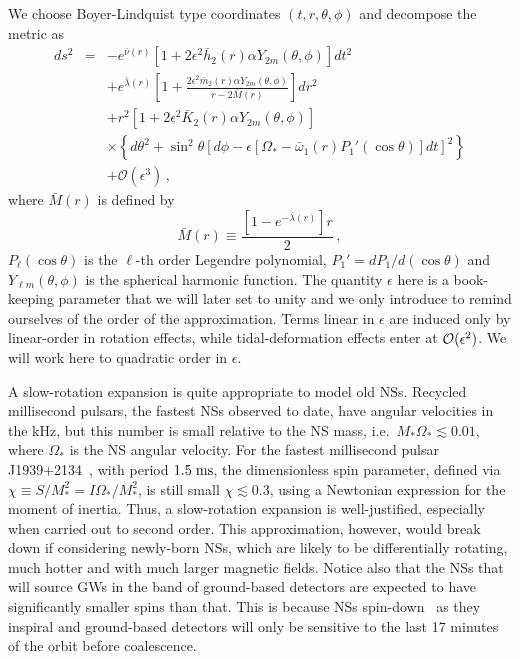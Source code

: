 \documentclass[aps,twocolumn,nofootinbib,showpacs,superscriptaddress,hyperref]{revtex4-1}
\newcommand\be{\begin{equation}}
\newcommand\ba{\begin{eqnarray}}
\newcommand\ee{\end{equation}}
\newcommand\ea{\end{eqnarray}}
\newcommand{\nn}{\nonumber}
\newcommand{\NS}{*}
\begin{document}
We choose Boyer-Lindquist type coordinates $(t,r,\theta,\phi)$ and decompose the metric as
%
\ba
ds^2 &=& -e^{\bar{\nu}(r)} \left[1+2 \epsilon^2 \bar{h}_2 (r) \alpha Y_{2 m}(\theta,\phi) \right] dt^2 \nn \\
& & + e^{\bar{\lambda}(r)} \left[ 1+\frac{2 \epsilon^2 \bar{m}_2 (r) \alpha Y_{2 m}(\theta,\phi)}{r-2\bar{M}(r)} \right] dr^2 \nn \\
& & + r^2 \left[ 1+2 \epsilon^2 \bar{K}_2(r) \alpha Y_{2 m}(\theta,\phi) \right] \nn \\
& & \times \left\{ d \theta^2 + \sin^2 \theta \left[ d\phi - \epsilon [\Omega_\NS - \bar{\omega}_1 (r) P_1' (\cos \theta) ] dt \right]^2 \right\} \nn \\
& & + \mathcal{O}(\epsilon^3)\,, 
\label{metric-ansatz-rth}
\ea
%
where $\bar{M}(r)$ is defined by
%
\be
\bar{M}(r) \equiv \frac{\left[ 1-e^{-\bar{\lambda}(r)} \right]r}{2}\,,
\ee
%
$P_\ell (\cos \theta)$ is the $\ell$-th order Legendre polynomial, $P_{1}' = d P_{1}/d(\cos{\theta})$ and $Y_{\ell m}(\theta, \phi)$ is the spherical harmonic function. The quantity $\epsilon$ here is a book-keeping parameter that we will later set to unity and we only introduce to remind ourselves of the order of the approximation. Terms linear in $\epsilon$ are induced only by linear-order in rotation effects, while tidal-deformation effects enter at ${\cal{O}}(\epsilon^{2})$. We will work here to quadratic order in $\epsilon$.

A slow-rotation expansion is quite appropriate to model old NSs. Recycled millisecond pulsars, the fastest NSs observed to date, have angular velocities in the kHz, but this number is small relative to the NS mass, i.e.~$M_{\NS} \Omega_{\NS} \lesssim 0.01$, where $\Omega_\NS$ is the NS angular velocity. For the fastest millisecond pulsar J1939+2134~\cite{fastest-pulsar}, with period $1.5 \; {\rm{ms}}$, the dimensionless spin parameter, defined via $\chi \equiv S/M_{\NS}^{2} = I \Omega_{\NS}/M_{\NS}^{2}$, is still small $\chi \lesssim 0.3$, using a Newtonian expression for the moment of inertia. Thus, a slow-rotation expansion is well-justified, especially when carried out to second order. This approximation, however, would break down if considering newly-born NSs, which are likely to be differentially rotating, much hotter and with much larger magnetic fields. Notice also that the NSs that will source GWs in the band of ground-based detectors are expected to have significantly smaller spins than that. This is because NSs spin-down~\cite{bildsten-cutler} as they inspiral and ground-based detectors will only be sensitive to the last 17 minutes of the orbit before coalescence.
\end{document}
